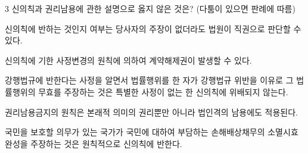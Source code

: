 \begin{question}{3}
신의칙과 권리남용에 관한 설명으로 옳지 않은 것은? (다툼이 있으면 판례에 따름)
\begin{choices}
  \item 신의칙에 반하는 것인지 여부는 당사자의 주장이 없더라도 법원이 직권으로 판단할 수 있다.
  \item 신의칙에 기한 사정변경의 원칙에 의하여 계약해제권이 발생할 수 있다.
  \item 강행법규에 반한다는 사정을 알면서 법률행위를 한 자가 강행법규 위반을 이유로 그 법률행위의 무효를 주장하는 것은 특별한 사정이 없는 한 신의칙에 위배되지 않는다.
  \item 권리남용금지의 원칙은 본래적 의미의 권리뿐만 아니라 법인격의 남용에도 적용된다.
  \item 국민을 보호할 의무가 있는 국가가 국민에 대하여 부담하는 손해배상채무의 소멸시효 완성을 주장하는 것은 원칙적으로 신의칙에 반한다.
\end{choices}
\end{question}
